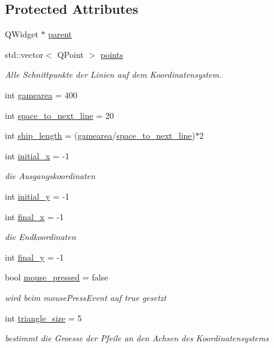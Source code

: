 \subsection*{Protected Attributes}
\begin{DoxyCompactItemize}
\item 
Q\+Widget $\ast$ \hyperlink{classGUI_1_1CoordinateSystem_a1799d742cabf4aedc2b3553023ccd368}{parent}
\item 
std\+::vector$<$ Q\+Point $>$ \hyperlink{classGUI_1_1CoordinateSystem_af6b75c3f51fa26c16961a577565e177e}{points}
\begin{DoxyCompactList}\small\item\em Alle Schnittpunkte der Linien auf dem Koordinatensystem. \end{DoxyCompactList}\item 
int \hyperlink{classGUI_1_1CoordinateSystem_af95e9c45410ea5d7085675933c5eeae3}{gamearea} = 400
\item 
int \hyperlink{classGUI_1_1CoordinateSystem_ad513b38928d1200efd7c23313bf19a6f}{space\+\_\+to\+\_\+next\+\_\+line} = 20
\item 
int \hyperlink{classGUI_1_1CoordinateSystem_aee01da46fa67198ecaa2f6f4d640c4be}{ship\+\_\+length} = (\hyperlink{classGUI_1_1CoordinateSystem_af95e9c45410ea5d7085675933c5eeae3}{gamearea}/\hyperlink{classGUI_1_1CoordinateSystem_ad513b38928d1200efd7c23313bf19a6f}{space\+\_\+to\+\_\+next\+\_\+line})$\ast$2
\item 
int \hyperlink{classGUI_1_1CoordinateSystem_a4aea6960b7b2ff7fe72c11feaead9d78}{initial\+\_\+x} = -\/1
\begin{DoxyCompactList}\small\item\em die Ausgangskoordinaten \end{DoxyCompactList}\item 
int \hyperlink{classGUI_1_1CoordinateSystem_a5a8fb7f950cc366b0a248a04fb2270da}{initial\+\_\+y} = -\/1
\item 
int \hyperlink{classGUI_1_1CoordinateSystem_a5e3c4d4ddb249df69bacc54748304113}{final\+\_\+x} = -\/1
\begin{DoxyCompactList}\small\item\em die Endkoordinaten \end{DoxyCompactList}\item 
int \hyperlink{classGUI_1_1CoordinateSystem_a7be498e5c36f146dc15c99d79a1dec26}{final\+\_\+y} = -\/1
\item 
bool \hyperlink{classGUI_1_1CoordinateSystem_a76fde535d6e6d8b00594daf38372fa0d}{mouse\+\_\+pressed} = false
\begin{DoxyCompactList}\small\item\em wird beim mouse\+Press\+Event auf true gesetzt \end{DoxyCompactList}\item 
int \hyperlink{classGUI_1_1CoordinateSystem_aac44d9cfd174bff52e3126dcc059d851}{triangle\+\_\+size} = 5
\begin{DoxyCompactList}\small\item\em bestimmt die Groesse der Pfeile an den Achsen des Koordinatensystems \end{DoxyCompactList}\end{DoxyCompactItemize}


